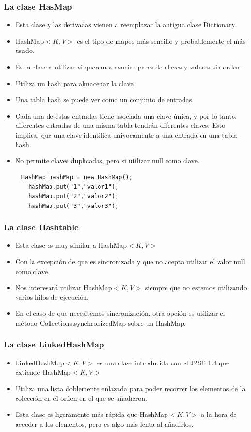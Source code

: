 \documentclass{beamer}
\begin{document}
\begin{frame}[fragile]
\frametitle{La clase HasMap}
\begin{itemize}[<+->]
\item Esta clase y las derivadas vienen a reemplazar la antigua clase Dictionary.
\item HashMap$<K,V>$ es el tipo de mapeo más sencillo y probablemente el más usado.
\item Es la clase a utilizar si queremos asociar pares de claves y valores sin orden.
\item Utiliza un hash para almacenar la clave.
\item Una tabla hash se puede ver como un conjunto de entradas.
\item  Cada una de estas entradas tiene asociada una clave única, y por lo tanto, diferentes entradas de una misma tabla tendrán diferentes claves.
Esto implica, que una clave identifica univocamente a una entrada en una tabla hash.
\item No permite claves duplicadas, pero si utilizar null como clave.
\end{itemize}
\pause
\begin{verbatim}
     HashMap hashMap = new HashMap();
       hashMap.put("1","valor1");
       hashMap.put("2","valor2");
       hashMap.put("3","valor3");
\end{verbatim}
\end{frame}

\begin{frame}
\frametitle{La clase Hashtable}
\begin{itemize}[<+->]
\item Esta clase es muy similar a HashMap$<K,V>$
\item Con la excepción de que es sincronizada y que no acepta utilizar el valor null como clave.
\item Nos interesará utilizar HashMap$<K,V>$ siempre que no estemos utilizando varios hilos de ejecución.
\item En el caso de que necesitemos sincronización, otra opción es utilizar el método Collections.synchronizedMap sobre un HashMap.
\end{itemize}
\end{frame}

\begin{frame}
\frametitle{La clase LinkedHashMap}
\begin{itemize}[<+->]
\item LinkedHashMap$<K,V>$ es una clase introducida con el J2SE 1.4 que extiende HashMap$<K,V>$ 
\item Utiliza una lista doblemente enlazada para poder recorrer los elementos de la colección en el orden en el que se añadieron.
\item Esta clase es ligeramente más rápida que HashMap$<K,V>$ a la hora de acceder a los elementos, pero es algo más lenta al añadirlos.
\end{itemize}
\end{frame}
\end{document}

